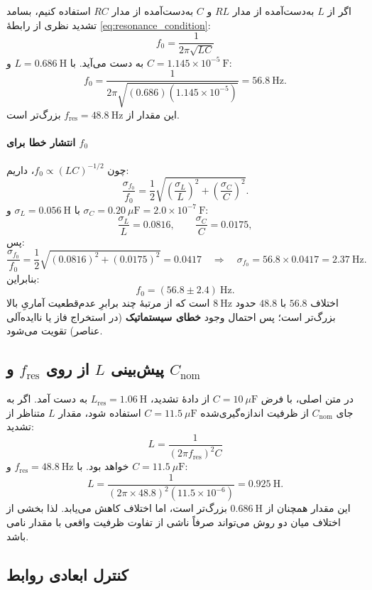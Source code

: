 \documentclass[a4paper, 11pt]{article}
\begin{document}
اگر از \(L\) به‌دست‌آمده از مدار $RL$ و \(C\) به‌دست‌آمده از مدار $RC$ استفاده کنیم، بسامد تشدید نظری از رابطهٔ \eqref{eq:resonance_condition}:
\[
f_0=\frac{1}{2\pi\sqrt{LC}}
\]
به دست می‌آید. با \(L=0.686~\mathrm{H}\) و \(C=1.145\times 10^{-5}~\mathrm{F}\):
\[
f_0=\frac{1}{2\pi\sqrt{(0.686)(1.145\times10^{-5})}}=56.8~\mathrm{Hz}.
\]
این مقدار از \(f_{\mathrm{res}}=48.8~\mathrm{Hz}\) بزرگ‌تر است.

\paragraph{انتشار خطا برای \(f_0\)}
چون \(f_0\propto (LC)^{-1/2}\)، داریم:
\[
\frac{\sigma_{f_0}}{f_0}=\frac{1}{2}\sqrt{\left(\frac{\sigma_L}{L}\right)^2+\left(\frac{\sigma_C}{C}\right)^2}.
\]
با \(\sigma_L=0.056\ \mathrm{H}\) و \(\sigma_C=0.20~\mu\mathrm{F}=2.0\times10^{-7}\ \mathrm{F}\):
\[
\frac{\sigma_L}{L}=0.0816,\qquad
\frac{\sigma_C}{C}=0.0175,
\]
پس:
\[
\frac{\sigma_{f_0}}{f_0}=\frac{1}{2}\sqrt{(0.0816)^2+(0.0175)^2}=0.0417
\quad\Rightarrow\quad
\sigma_{f_0}=56.8\times 0.0417=2.37~\mathrm{Hz}.
\]
بنابراین:
\[
f_0 = (56.8\pm 2.4)\ \mathrm{Hz}.
\]
اختلاف \(56.8\) با \(48.8\) حدود \(8~\mathrm{Hz}\) است که از مرتبهٔ چند برابرِ عدم‌قطعیت آماریِ بالا بزرگ‌تر است؛ پس احتمال وجود \textbf{خطای سیستماتیک} (در استخراج فاز یا ناایده‌آلی عناصر) تقویت می‌شود.

\subsection{پیش‌بینی \(L\) از روی \(f_{\mathrm{res}}\) و \(C_{\mathrm{nom}}\)}

در متن اصلی، با فرض \(C=10~\mu\mathrm{F}\) از دادهٔ تشدید، \(L_{\mathrm{res}}=1.06~\mathrm{H}\) به دست آمد. اگر به جای \(C_{\mathrm{nom}}\) از ظرفیت اندازه‌گیری‌شده \(C=11.5~\mu\mathrm{F}\) استفاده شود، مقدار \(L\) متناظر از تشدید:
\[
L=\frac{1}{(2\pi f_{\mathrm{res}})^2 C}
\]
خواهد بود. با \(f_{\mathrm{res}}=48.8~\mathrm{Hz}\) و \(C=11.5~\mu\mathrm{F}\):
\[
L=\frac{1}{(2\pi\times48.8)^2(11.5\times 10^{-6})}=0.925~\mathrm{H}.
\]
این مقدار همچنان از \(0.686~\mathrm{H}\) بزرگ‌تر است، اما اختلاف کاهش می‌یابد. لذا بخشی از اختلاف میان دو روش می‌تواند صرفاً ناشی از تفاوت ظرفیت واقعی با مقدار نامی باشد.

\subsection{کنترل ابعادی روابط}
\end{document}
